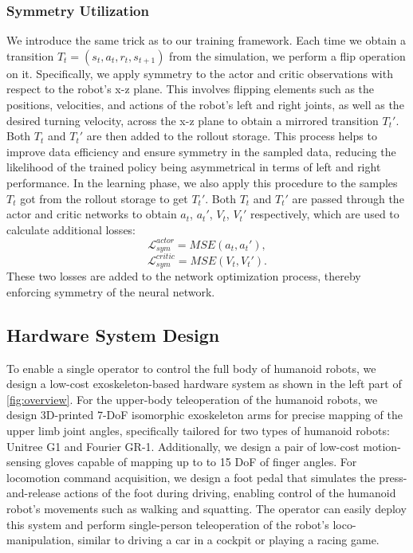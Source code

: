 \subsubsection{Symmetry Utilization}
We introduce the same trick as \cite{su2024leveraging} to our training framework. Each time we obtain a transition $T_t=(s_t, a_t, r_t, s_{t+1})$ from the simulation, we perform a flip operation on it. Specifically, we apply symmetry to the actor and critic observations with respect to the robot's x-z plane. This involves flipping elements such as the positions, velocities, and actions of the robot's left and right joints, as well as the desired turning velocity, across the x-z plane to obtain a mirrored transition $T_t'$. Both $T_t$ and $T_t'$ are then added to the rollout storage. This process helps to improve data efficiency and ensure symmetry in the sampled data, reducing the likelihood of the trained policy being asymmetrical in terms of left and right performance. In the learning phase, we also apply this procedure to the samples $T_t$ got from the rollout storage to get $T_t'$. Both $T_t$ and $T_t'$ are passed through the actor and critic networks to obtain $a_t$, $a_t'$, $V_t$, $V_t'$ respectively, which are used to calculate additional losses:
\begin{equation}
    \mathcal{L}^{actor}_{sym}=MSE(a_t,a_t'),
\end{equation}
\begin{equation}
    \mathcal{L}^{critic}_{sym}=MSE(V_t,V_t').
\end{equation}
These two losses are added to the network optimization process, thereby enforcing symmetry of the neural network.

\subsection{Hardware System Design}
\label{sec:hard_design}
To enable a single operator to control the full body of humanoid robots, we design a low-cost  exoskeleton-based hardware system as shown in the left part of \cref{fig:overview}. For the upper-body teleoperation of the humanoid robots, we  design 3D-printed 7-DoF isomorphic exoskeleton arms for precise mapping of the upper limb joint angles, specifically tailored for two types of humanoid robots: Unitree G1 and Fourier GR-1. Additionally, we design a pair of low-cost motion-sensing gloves capable of mapping up to  to 15 DoF of finger angles. For locomotion command acquisition, we design a foot pedal that simulates the press-and-release actions of the foot during driving, enabling control of the humanoid robot's movements such as walking and squatting. The operator can easily deploy this system and perform single-person teleoperation of the robot's loco-manipulation, similar to driving a car in a cockpit or playing a racing game.


